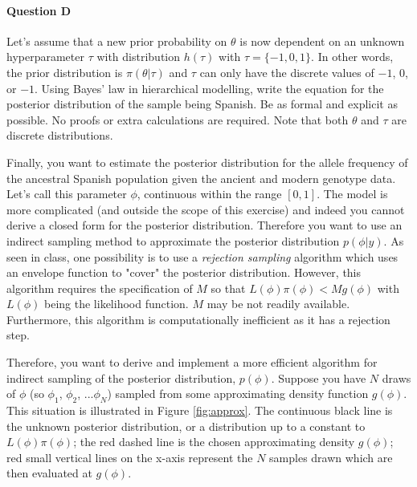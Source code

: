 \paragraph{Question D}

Let's assume that a new prior probability on $\theta$ is now dependent on an unknown hyperparameter $\tau$ with distribution $h(\tau)$ with $\tau=\{-1,0,1\}$. In other words, the prior distribution is $\pi(\theta|\tau)$ and $\tau$ can only have the discrete values of $-1$, $0$, or $-1$. Using Bayes' law in hierarchical modelling, write the equation for the posterior distribution of the sample being Spanish. Be as formal and explicit as possible. No proofs or extra calculations are required. Note that both $\theta$ and $\tau$ are discrete distributions.

Finally, you want to estimate the posterior distribution for the allele frequency of the ancestral Spanish population given the ancient and modern genotype data. Let's call this parameter $\phi$, continuous within the range $[0,1]$. The model is more complicated (and outside the scope of this exercise) and indeed you cannot derive a closed form for the posterior distribution. Therefore you want to use an indirect sampling method to approximate the posterior distribution $p(\phi|y)$.
As seen in class, one possibility is to use a \textit{rejection sampling} algorithm which uses an envelope function to "cover" the posterior distribution. However, this algorithm requires the specification of $M$ so that $L(\phi)\pi(\phi) < Mg(\phi)$ with $L(\phi)$ being the likelihood function. $M$ may be not readily available. Furthermore, this algorithm is computationally inefficient as it has a rejection step.

Therefore, you want to derive and implement a more efficient algorithm for indirect sampling of the posterior distribution, $p(\phi)$. Suppose you have $N$ draws of $\phi$ (so $\phi_1$, $\phi_2$, ...$\phi_N$) sampled from some approximating density function $g(\phi)$. This situation is illustrated in Figure \ref{fig:approx}. The continuous black line is the unknown posterior distribution, or a distribution up to a constant to $L(\phi)\pi(\phi)$; the red dashed line is the chosen approximating density $g(\phi)$; red small vertical lines on the x-axis represent the $N$ samples drawn which are then evaluated at $g(\phi)$.

